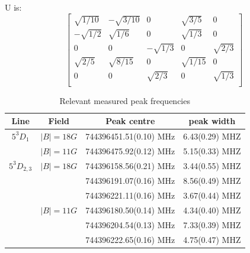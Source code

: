 \documentclass{article}
\begin{document}
U is:
\begin{equation}
\begin{bmatrix}
\sqrt{1/10} &-\sqrt{3/10}	&   0		&  \sqrt{3/5}	&    0	\\ %
-\sqrt{1/2}	& \sqrt{1/6}	&	0 		&  \sqrt{1/3}	&    0	\\ %
	0		&	0			&-\sqrt{1/3}&  	0  			&   \sqrt{2/3} 	\\ %
\sqrt{2/5}  &	\sqrt{8/15}	&	 0		&  \sqrt{1/15}  &    0 	\\ %
	0		&	0			&\sqrt{2/3} &  0   			&    \sqrt{1/3}	\\ %
\end{bmatrix}
\end{equation}
\begin{table}
\label{peaktable}
\begin{tabular}{|c c|c|c|}
\hline
Line & Field & Peak centre & peak width\\
\hline
$5^3D_{1}$ & $|B| = 18G$& 744396451.51(0.10) MHz & 6.43(0.29) MHZ\\
			& $|B| = 11G$& 744396475.92(0.12) MHz & 5.15(0.33) MHZ\\
\hline
$5^3D_{2,3}$ & $|B| = 18G$& 744396158.56(0.21) MHz & 3.44(0.55) MHZ\\
						&& 744396191.07(0.16) MHz & 8.56(0.49) MHZ\\
						&& 744396221.11(0.16) MHz & 3.67(0.44) MHZ\\
			& $|B| = 11G$& 744396180.50(0.14) MHz & 4.34(0.40) MHZ\\
						&& 744396204.54(0.13) MHz & 7.33(0.39) MHZ\\
						&& 744396222.65(0.16) MHz & 4.75(0.47) MHZ\\
\hline
\end{tabular}
\caption{Relevant measured peak frequencies}
\end{table}




\appendix

\end{document}
